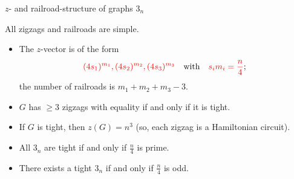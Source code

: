 \documentclass[%
pdf,
colorBG,
slideColor,
]{prosper}
\begin{document}
\begin{slide}{$z$- and railroad-structure of graphs $3_n$}

All zigzags and railroads are simple. 

\begin{itemize}
\item The $z$-vector is of the form 
\begin{equation*}
\textcolor{red}{(4s_1)^{m_1}, (4s_2)^{m_2},(4s_3)^{m_3}}\mbox{~~~with~~~}\textcolor{red}{s_im_i=\frac{n}{4}};
\end{equation*}
the number of railroads is $m_1+m_2+m_3-3$.

\item $G$ has $\geq 3$ zigzags with equality if and only if it is tight.

\item If $G$ is tight, then $z(G)=n^3$ (so, each zigzag is a Hamiltonian circuit).


\item All $3_n$ are tight if and only if $\frac{n}{4}$ is prime.

\item There exists a tight  $3_n$ if and only if $\frac{n}{4}$ is odd.
\end{itemize}


\end{slide}
\end{document}
